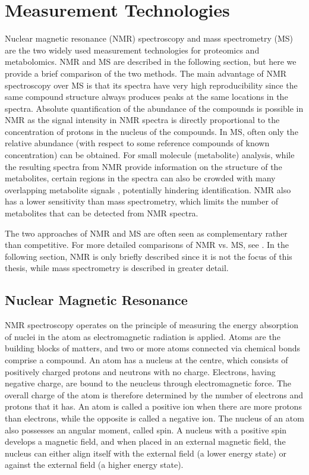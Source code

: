\section{Measurement Technologies\label{sub:mass-spec}}

Nuclear magnetic resonance (NMR) spectroscopy and mass spectrometry (MS) are the two widely used measurement technologies for proteomics and metabolomics. NMR and MS are described in the following section, but here we provide a brief comparison of the two methods. The main advantage of NMR spectroscopy over MS is that its spectra have very high reproducibility since the same compound structure always produces peaks at the same locations in the spectra. Absolute quantification of the abundance of the compounds is possible in NMR as the signal intensity in NMR spectra is directly proportional to the concentration of protons in the nucleus of the compounds. In MS, often only the relative abundance (with respect to some reference compounds of known concentration) can be obtained. For small molecule (metabolite) analysis, while the resulting spectra from NMR provide information on the structure of the metabolites, certain regions in the spectra can also be crowded with many overlapping metabolite signals \cite{Pan2007}, potentially hindering identification. NMR also has a lower sensitivity than mass spectrometry, which limits the number of metabolites that can be detected from NMR spectra. 

The two approaches of NMR and MS are often seen as complementary rather than competitive. For more detailed comparisons of NMR vs. MS, see \cite{Pan2007}. In the following section, NMR is only briefly described since it is not the focus of this thesis, while mass spectrometry is described in greater detail.

\subsection{Nuclear Magnetic Resonance}

NMR spectroscopy operates on the principle of measuring the energy absorption of nuclei in the atom as electromagnetic radiation is applied. Atoms are the building blocks of matters, and two or more atoms connected via chemical bonds comprise a compound. An atom has a nucleus at the centre, which consists of positively charged protons and neutrons with no charge. Electrons, having negative charge, are bound to the neucleus through electromagnetic force. The overall charge of the atom is therefore determined by the number of electrons and protons that it has. An atom is called a positive ion when there are more protons than electrons, while the opposite is called a negative ion. The nucleus of an atom also possesses an angular moment, called spin. A nucleus with a positive spin develops a magnetic field, and when placed in an external magnetic field, the nucleus can either align itself with the external field (a lower energy state) or against the external field (a higher energy state). 

